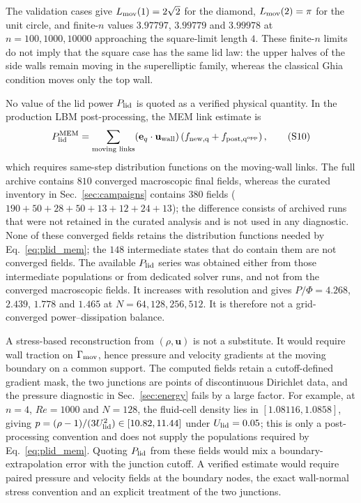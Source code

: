 \documentclass[11pt]{article}
\begin{document}
The validation cases give $L_{\rm mov}(1)=2\sqrt2$ for the diamond,
$L_{\rm mov}(2)=\pi$ for the unit circle, and finite-$n$ values
$3.97797$, $3.99779$ and $3.99978$ at $n=100,1000,10000$ approaching the
square-limit length $4$. These finite-$n$ limits do not imply that the square
case has the same lid law: the upper halves of the side walls remain moving in
the superelliptic family, whereas the classical Ghia condition moves only the
top wall.

No value of the lid power $P_{\rm lid}$ is quoted as a verified physical
quantity. In the production LBM post-processing, the MEM link estimate is
\[
  P_{\rm lid}^{\rm MEM}=\sum_{\text{moving links}}
  (\mathbf{e}_q\cdot\mathbf{u}_{\rm wall})
  \left(f_{\rm new,q}+f_{\rm post,q^{\rm opp}}\right),
  \tag{S10}
  \label{eq:plid_mem}
\]
which requires same-step distribution functions on the moving-wall links. The
full archive contains $810$ converged macroscopic final fields, whereas the
curated inventory in Sec.~\ref{sec:campaigns} contains $380$ fields
($190+50+28+50+13+12+24+13$); the difference consists of archived runs that
were not retained in the curated analysis and is not used in any diagnostic.
None of these converged fields retains the distribution functions needed by
Eq.~\eqref{eq:plid_mem}; the $148$ intermediate states that do contain them
are not converged fields. The available $P_{\rm lid}$ series was obtained
either from those intermediate populations
or from dedicated solver runs, and not from the converged macroscopic fields.
It increases with resolution and gives $P/\Phi=4.268$, $2.439$, $1.778$ and
$1.465$ at $N=64,128,256,512$. It is therefore not a grid-converged
power--dissipation balance.

A stress-based reconstruction from $(\rho,\mathbf{u})$ is not a substitute. It
would require wall traction on $\Gamma_{\rm mov}$, hence pressure and velocity
gradients at the moving boundary on a common support. The computed fields retain
a cutoff-defined gradient mask, the two junctions are points of discontinuous
Dirichlet data, and the pressure diagnostic in Sec.~\ref{sec:energy} fails by a
large factor. For example, at $n=4$, $Re=1000$ and $N=128$, the fluid-cell
density lies in $[1.08116,1.0858]$, giving
$p=(\rho-1)/(3U_{\rm lid}^2)\in[10.82,11.44]$ under $U_{\rm lid}=0.05$; this is
only a post-processing convention and does not supply the populations required
by Eq.~\eqref{eq:plid_mem}. Quoting $P_{\rm lid}$ from these fields would mix a
boundary-extrapolation error with the junction cutoff. A verified estimate would
require paired pressure and velocity fields at the boundary nodes, the exact
wall-normal stress convention and an explicit treatment of the two junctions.
\end{document}
